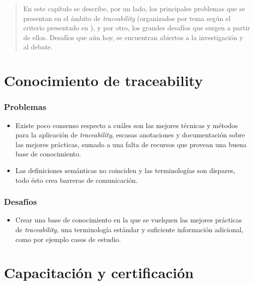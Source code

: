 \documentclass[a4paper,12pt,oneside,spanish]{book}
\begin{document}
\begin{quotation}
En este capítulo se describe, por un lado, los principales problemas que se presentan en el ámbito de \textit{traceability} (organizados por tema según el criterio presentado en \cite{Excellence}), y por otro, los grandes desafíos que surgen a partir de ellos. Desafíos que aún hoy, se encuentran abiertos a la investigación y al debate.
\end{quotation}


\bigskip


\minitoc 


\pagebreak


\section{Conocimiento de traceability}

\subsubsection{Problemas}

\begin{itemize}[label={$\times$}]

\item Existe poco consenso respecto a cuáles son las mejores técnicas y métodos para la aplicación de \textit{traceability}, escasas anotaciones y documentación sobre las mejores prácticas, sumado a una falta de recursos que provean una buena base de conocimiento.

\item Las definiciones semánticas no coinciden y las terminologías son dispares, todo ésto crea barreras de comunicación.

\end{itemize}

\subsubsection{Desafíos}

\begin{itemize}[label={\checkmark}]

\item Crear una base de conocimiento en la que se vuelquen las mejores prácticas de \textit{traceability}, una terminología estándar y suficiente información adicional, como por ejemplo casos de estudio.

\end{itemize}

\section{Capacitación y certificación}
\end{document}
